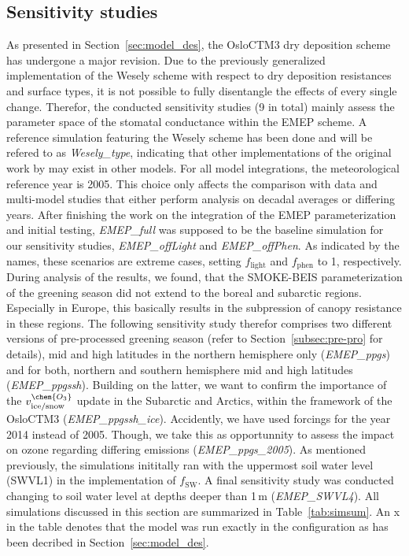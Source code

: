 \documentclass[gmd, manuscript]{copernicus}
\begin{document}
\subsection{Sensitivity studies}
\label{subsec:sens}
As presented in Section~\ref{sec:model_des}, the OsloCTM3 dry deposition scheme has undergone a major revision. Due to the previously generalized implementation of the Wesely scheme with respect to dry deposition resistances and surface types, it is not possible to fully disentangle the effects of every single change. Therefor, the conducted sensitivity studies (9 in total) mainly assess the parameter space of the stomatal conductance within the EMEP scheme. A reference simulation featuring the Wesely scheme has been done and will be refered to as \emph{Wesely\_type}, indicating that other implementations of the original work by \citet{AE:Wesely1989} may exist in other models. For all model integrations, the meteorological reference year is 2005. This choice only affects the comparison with data and multi-model studies that either perform analysis on decadal averages or differing years. After finishing the work on the integration of the EMEP parameterization and initial testing, \emph{EMEP\_full} was supposed to be the baseline simulation for our sensitivity studies, \emph{EMEP\_offLight} and \emph{EMEP\_offPhen}. As indicated by the names, these scenarios are extreme cases, setting $f_\text{light}$ and $f_\text{phen}$ to 1, respectively. During analysis of the results, we found, that the SMOKE-BEIS parameterization of the greening season did not extend to the boreal and subarctic regions. Especially in Europe, this basically results in the subpression of canopy resistance in these regions. The following sensitivity study therefor comprises two different versions of pre-processed greening season (refer to Section~\ref{subsec:pre-pro} for details), mid and high latitudes in the northern hemisphere only (\emph{EMEP\_ppgs}) and for both, northern and southern hemisphere mid and high latitudes (\emph{EMEP\_ppgssh}). Building on the latter, we want to confirm the importance of the $v^\chem{O_3}_\text{ice/snow}$ update \citep{ACP:Helmig2007} in the Subarctic and Arctics, within the framework of the OsloCTM3 (\emph{EMEP\_ppgssh\_ice}). Accidently, we have used forcings for the year 2014 instead of 2005. Though, we take this as opportunnity to assess the impact on ozone regarding differing emissions (\emph{EMEP\_ppgs\_2005}). As mentioned previously, the simulations inititally ran with the uppermost soil water level (SWVL1) in the implementation of $f_\text{SW}$. A final sensitivity study was conducted changing to soil water level at depths deeper than 1\,\unit{m} (\emph{EMEP\_SWVL4}).
All simulations discussed in this section are summarized in Table~\ref{tab:simsum}. An x in the table denotes that the model was run exactly in the configuration as has been decribed in Section~\ref{sec:model_des}.
\end{document}

